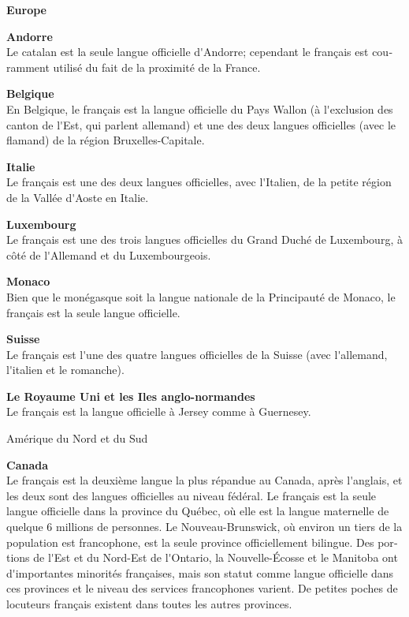 \begin{french}
\begin{multicols}{2}
\begin{center}
{\bf {\sc Europe}}
\end{center}

{\bf Andorre}\\
Le catalan est la seule langue officielle d{\mbox '}Andorre; cependant
le français est couramment utilisé du fait de la proximité de la
France.

{\bf Belgique}\\
En Belgique, le français est la langue officielle du Pays Wallon (à
l{\mbox '}exclusion des canton de l{\mbox '}Est, qui parlent allemand)
et une des deux langues officielles (avec le flamand) de la région
Bruxelles-Capitale.

{\bf Italie}\\
Le français est une des deux langues officielles, avec l{\mbox
 '}Italien, de la petite région de la Vallée d{\mbox '}Aoste en
Italie.

{\bf Luxembourg}\\
Le français est une des trois langues officielles du Grand Duché de
Luxembourg, à côté de l{\mbox '}Allemand et du Luxembourgeois.

{\bf Monaco}\\ 
Bien que le monégasque soit la langue nationale de la Principauté de
Monaco, le français est la seule langue officielle.

{\bf Suisse}\\
Le français est l{\mbox '}une des quatre langues officielles de la
Suisse (avec l{\mbox '}allemand, l{\mbox '}italien et le romanche).

{\bf Le Royaume Uni et les Iles  anglo-normandes}\\
Le français est la langue officielle à Jersey comme à Guernesey.

\begin{center}
{\sc Amérique du Nord et du Sud}
\end{center}

{\bf Canada}\\
Le français est la deuxième langue la plus répandue au Canada, après
l{\mbox '}anglais, et les deux sont des langues officielles au niveau
fédéral. Le français est la seule langue officielle dans la province
du Québec, où elle est la langue maternelle de quelque 6 millions de
personnes. Le Nouveau-Brunswick, où environ un tiers de la population
est francophone, est la seule province officiellement bilingue. Des
portions de l{\mbox '}Est et du Nord-Est de l{\mbox '}Ontario, la
Nouvelle-Écosse et le Manitoba ont d{\mbox '}importantes minorités françaises,
mais son statut comme langue officielle dans ces provinces et le
niveau des services francophones varient. De petites poches de
locuteurs français existent dans toutes les autres provinces.


\end{multicols}
\end{french}

